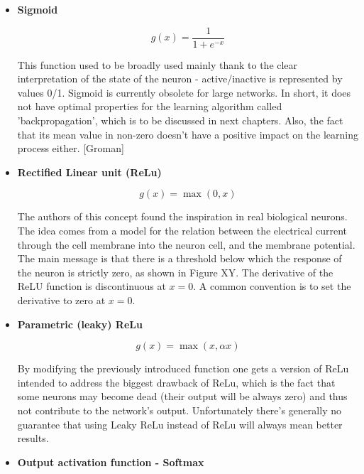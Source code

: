 \begin{itemize}

\item \textbf{Sigmoid}

$$  
g(x)=\frac{1}{1 + e^{-x}}
$$

This function used to be broadly used mainly thank to the clear interpretation of the state of the neuron - active/inactive is represented by values 0/1. Sigmoid is currently obsolete for large networks. In short, it does not have optimal properties for the learning algorithm called 'backpropagation', which is to be discussed in next chapters. Also, the fact that its mean value in non-zero doesn't have a positive impact on the learning process either. [Groman]




\item \textbf{Rectified Linear unit (ReLu)}

$$
g(x)=\max (0,x)
$$

The authors of this concept found the inspiration in real biological neurons. The idea comes from a model for the relation between the electrical current through the cell membrane into the neuron cell, and the membrane potential. The main message is that there is a threshold below which the response of the neuron is strictly zero, as shown in Figure XY. The derivative of the ReLU function is discontinuous at $ x=0 $. A common convention is to set the derivative to zero at $ x=0 $.  

\item \textbf{Parametric (leaky) ReLu}

$$
g(x)=\max(x,\alpha x)
$$

By modifying the previously introduced function one gets a version of ReLu intended to address the biggest drawback of ReLu, which is the fact that some neurons may become dead (their output will be always zero) and thus not contribute to the network's output. Unfortunately there's generally no guarantee that using Leaky ReLu instead of ReLu will always mean better results. 

\item \textbf{Output activation function - Softmax}


\end{itemize}
